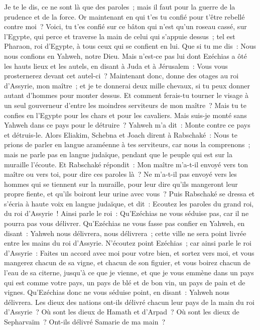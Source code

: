 \begin{multicols}{2}
Je te le dis, ce ne sont là que des paroles~; mais il faut pour la guerre de la prudence et de la force. Or maintenant en qui t'es tu confié pour t'être rebellé contre moi~?
Voici, tu t'es confié sur ce bâton qui n'est qu'un roseau cassé, sur l'Egypte, qui perce et traverse la main de celui qui s'appuie dessus~; tel est Pharaon, roi d'Egypte, à tous ceux qui se confient en lui.
Que si tu me dis~: Nous nous confions en Yahweh, notre Dieu. Mais n'est-ce pas lui dont Ezéchias a ôté les hauts lieux et les autels, en disant à Juda et à Jérusalem~: Vous vous prosternerez devant cet autel-ci~?
Maintenant donc, donne des otages au roi d'Assyrie, mon maître~; et je te donnerai deux mille chevaux, si tu peux donner autant d'hommes pour monter dessus.
Et comment ferais-tu tourner le visage à un seul gouverneur d'entre les moindres serviteurs de mon maître~? Mais tu te confies en l'Egypte pour les chars et pour les cavaliers.
Mais suis-je monté sans Yahweh dans ce pays pour le détruire~? Yahweh m'a dit~: Monte contre ce pays et détruis-le.
Alors Eliakim, Schebna et Joach dirent à Rabschaké~: Nous te prions de parler en langue araméenne à tes serviteurs, car nous la comprenons~; mais ne parle pas en langue judaïque, pendant que le peuple qui est sur la muraille l'écoute.
Et Rabschaké répondit~: Mon maître m'a-t-il envoyé vers ton maître ou vers toi, pour dire ces paroles là~? Ne m'a-t-il pas envoyé vers les hommes qui se tiennent sur la muraille, pour leur dire qu'ils mangeront leur propre fiente, et qu'ils boiront leur urine avec vous~?
Puis Rabschaké se dressa et s'écria à haute voix en langue judaïque, et dit~: Ecoutez les paroles du grand roi, du roi d'Assyrie~!
Ainsi parle le roi~: Qu'Ezéchias ne vous séduise pas, car il ne pourra pas vous délivrer.
Qu'Ezéchias ne vous fasse pas confier en Yahweh, en disant~: Yahweh nous délivrera, nous délivrera~; cette ville ne sera point livrée entre les mains du roi d'Assyrie.
N'écoutez point Ezéchias~; car ainsi parle le roi d'Assyrie~: Faites un accord avec moi pour votre bien, et sortez vers moi, et vous mangerez chacun de sa vigne, et chacun de son figuier, et vous boirez chacun de l'eau de sa citerne,
jusqu'à ce que je vienne, et que je vous emmène dans un pays qui est comme votre pays, un pays de blé et de bon vin, un pays de pain et de vignes.
Qu'Ezéchias donc ne vous séduise point, en disant~: Yahweh nous délivrera. Les dieux des nations ont-ils délivré chacun leur pays de la main du roi d'Assyrie~?
Où sont les dieux de Hamath et d'Arpad~? Où sont les dieux de Sepharvaïm~? Ont-ils délivré Samarie de ma main~?

\end{multicols}
